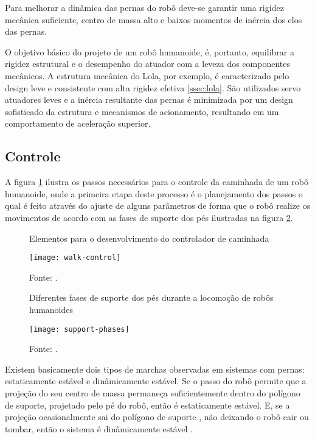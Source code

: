 Para melhorar a dinâmica das pernas do robô deve-se garantir uma rigidez mecânica suficiente, centro de massa alto e baixos momentos de inércia dos elos das pernas.

O objetivo básico do projeto de um robô humanoide, é, portanto, equilibrar a rigidez estrutural e o desempenho do atuador com a leveza dos componentes mecânicos.
A estrutura mecânica do Lola, por exemplo, é caracterizado pelo design leve e consistente com alta rigidez efetiva \ref{ssec:lola}. São utilizados servo atuadores leves e a inércia resultante das pernas é minimizada por um design sofisticado da estrutura e mecanismos de acionamento, resultando em um comportamento de aceleração superior.


\subsection{Controle}
\label{ssec:control}

A figura \ref{fig:steps-control} ilustra os passos necessários para o controle da caminhada de um robô humanoide, onde a primeira etapa deste processo é o planejamento dos passos o qual é feito através do ajuste de alguns parâmetros de forma que o robô realize os movimentos de acordo com as fases de suporte dos pés ilustradas na figura \ref{fig:support-phases}.


\begin{figure} [H]
    \centering
    \caption{Elementos para o desenvolvimento do controlador de caminhada}
    \texttt{[image: walk-control]}
    \caption*{Fonte: \cite{Kashyap2021306}.}
    \label{fig:steps-control}
\end{figure}


\begin{figure} [H]
    \centering
    \caption{Diferentes fases de suporte dos pés durante a locomoção de robôs humanoides}
    \texttt{[image: support-phases]}
    \caption*{Fonte: \cite{Kashyap2021306}.}
    \label{fig:support-phases}
\end{figure}

Existem basicamente dois tipos de marchas observadas em sistemas com pernas:  estaticamente estável e  dinâmicamente estável. Se o passo do robô permite que a projeção do seu centro de massa permaneça suficientemente dentro do polígono de suporte, projetado pelo pé do robô, então é estaticamente estável. E, se a projeção ocasionalmente sai do polígono de suporte , não deixando o robô cair ou tombar, então o sistema é dinâmicamente estável \cite{Ambarish20181}.

